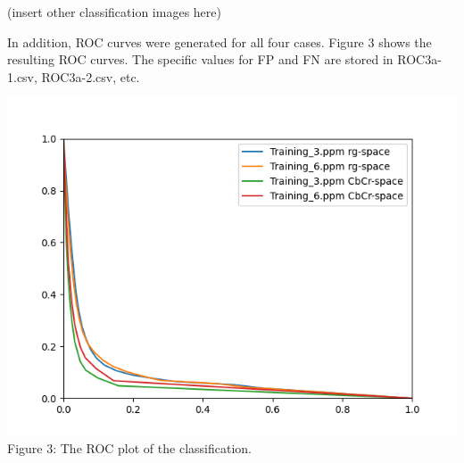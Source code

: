 \documentclass[ 12pt ]{article}
\begin{document}
\begin{enumerate}
\begin{enumerate}
    (insert other classification images here)

        In addition, ROC curves were generated for all four cases. Figure 3 shows the resulting ROC curves. The specific values for FP and FN are stored in ROC3a-1.csv, ROC3a-2.csv, etc.

    \begin{center}
    \includegraphics{ROC}
    \scriptsize
                    Figure 3: The ROC plot of the classification.
    \end{center}

        \end{enumerate}

\end{enumerate}
\end{document}

